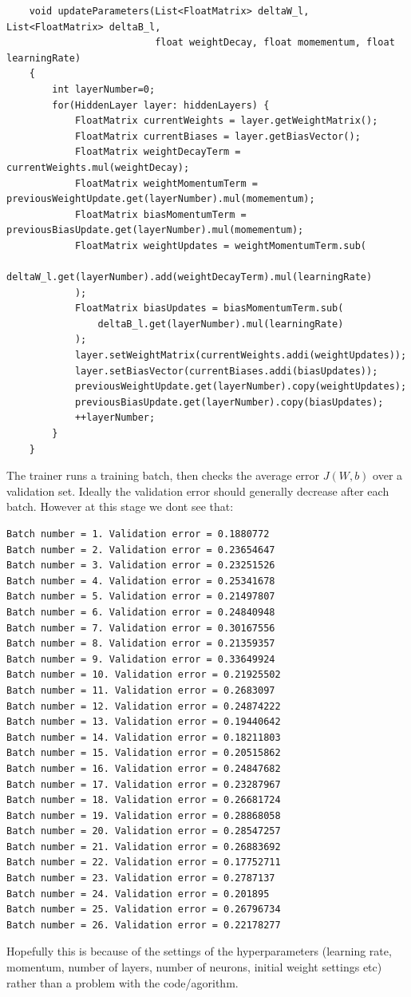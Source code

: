 \documentclass[11pt]{article} %
\begin{document}
\begin{lstlisting}
    void updateParameters(List<FloatMatrix> deltaW_l, List<FloatMatrix> deltaB_l,
                          float weightDecay, float momementum, float learningRate)
    {
        int layerNumber=0;
        for(HiddenLayer layer: hiddenLayers) {
            FloatMatrix currentWeights = layer.getWeightMatrix();
            FloatMatrix currentBiases = layer.getBiasVector();
            FloatMatrix weightDecayTerm = currentWeights.mul(weightDecay);
            FloatMatrix weightMomentumTerm = previousWeightUpdate.get(layerNumber).mul(momementum);
            FloatMatrix biasMomentumTerm = previousBiasUpdate.get(layerNumber).mul(momementum);
            FloatMatrix weightUpdates = weightMomentumTerm.sub(
                deltaW_l.get(layerNumber).add(weightDecayTerm).mul(learningRate)
            );
            FloatMatrix biasUpdates = biasMomentumTerm.sub(
                deltaB_l.get(layerNumber).mul(learningRate)
            );
            layer.setWeightMatrix(currentWeights.addi(weightUpdates));
            layer.setBiasVector(currentBiases.addi(biasUpdates));
            previousWeightUpdate.get(layerNumber).copy(weightUpdates);
            previousBiasUpdate.get(layerNumber).copy(biasUpdates);
            ++layerNumber;
        }
    }
\end{lstlisting}


The trainer runs a training batch, then checks the average error $J(W,b)$ over a validation set. Ideally the validation error should generally decrease after each batch. However at this stage we dont see that:
\begin{lstlisting}
Batch number = 1. Validation error = 0.1880772
Batch number = 2. Validation error = 0.23654647
Batch number = 3. Validation error = 0.23251526
Batch number = 4. Validation error = 0.25341678
Batch number = 5. Validation error = 0.21497807
Batch number = 6. Validation error = 0.24840948
Batch number = 7. Validation error = 0.30167556
Batch number = 8. Validation error = 0.21359357
Batch number = 9. Validation error = 0.33649924
Batch number = 10. Validation error = 0.21925502
Batch number = 11. Validation error = 0.2683097
Batch number = 12. Validation error = 0.24874222
Batch number = 13. Validation error = 0.19440642
Batch number = 14. Validation error = 0.18211803
Batch number = 15. Validation error = 0.20515862
Batch number = 16. Validation error = 0.24847682
Batch number = 17. Validation error = 0.23287967
Batch number = 18. Validation error = 0.26681724
Batch number = 19. Validation error = 0.28868058
Batch number = 20. Validation error = 0.28547257
Batch number = 21. Validation error = 0.26883692
Batch number = 22. Validation error = 0.17752711
Batch number = 23. Validation error = 0.2787137
Batch number = 24. Validation error = 0.201895
Batch number = 25. Validation error = 0.26796734
Batch number = 26. Validation error = 0.22178277
\end{lstlisting}
Hopefully this is because of the settings of the hyperparameters (learning rate, momentum, number of layers, number of neurons, initial weight settings etc) rather than a problem with the code/agorithm.
\end{document}
